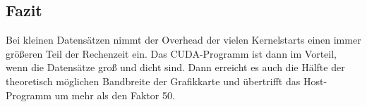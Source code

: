 \documentclass[ngerman]{scrartcl}
\begin{document}


\subsection{Fazit}
Bei kleinen Datensätzen nimmt der Overhead der vielen Kernelstarts einen immer größeren Teil der Rechenzeit ein.
Das CUDA-Programm ist dann im Vorteil, wenn die Datensätze groß und dicht sind. 
Dann erreicht es auch die Hälfte der theoretisch möglichen Bandbreite der Grafikkarte und übertrifft das Host-Programm um mehr als den Faktor 50.
\clearpage

\nocite{introductiontosvm}
\nocite{diplomarbeit}
\nocite{libsvm}
\nocite{cudaprogrammingguide}

\renewcommand{\refname}{Literaturverzeichnis}
{}

\end{document}
